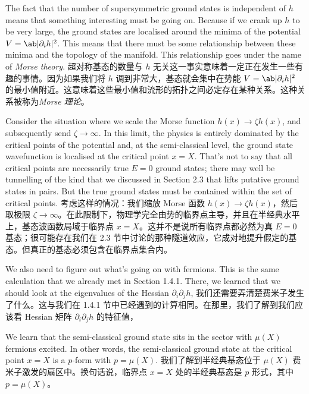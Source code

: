 \documentclass{article}
\begin{document}
\begin{paracol}{2}
The fact that the number of supersymmetric ground states is independent of $h$ means that something interesting must be going on. Because if we crank up $h$ to be very large, the ground states are localised around the minima of the potential $V = \ab|\partial_i h|^2$. This means that there must be some relationship between these minima and the topology of the manifold. This relationship goes under the name of \textit{Morse theory}.
\switchcolumn
超对称基态的数量与 $h$ 无关这一事实意味着一定正在发生一些有趣的事情。因为如果我们将 $h$ 调到非常大，基态就会集中在势能 $V = \ab|\partial_i h|^2$ 的最小值附近。这意味着这些最小值和流形的拓扑之间必定存在某种关系。这种关系被称为\textit{Morse 理论}。
\switchcolumn*

Consider the situation where we scale the Morse function $h(x) \to \zeta h(x)$, and subsequently send $\zeta \to \infty$. In this limit, the physics is entirely dominated by the critical points of the potential and, at the semi-classical level, the ground state wavefunction is localised at the critical point $x = X$. That’s not to say that all critical points are necessarily true $E = 0$ ground states; there may well be tunnelling of the kind that we discussed in Section 2.3 that lifts putative ground states in pairs. But the true ground states must be contained within the set of critical points.
\switchcolumn
考虑这样的情况：我们缩放 Morse 函数 $h(x) \to \zeta h(x)$，然后取极限 $\zeta \to \infty$。在此限制下，物理学完全由势的临界点主导，并且在半经典水平上，基态波函数局域于临界点 $x = X$。这并不是说所有临界点都必然为真 $E = 0$ 基态；很可能存在我们在 2.3 节中讨论的那种隧道效应，它成对地提升假定的基态。但真正的基态必须包含在临界点集合内。
\switchcolumn*

We also need to figure out what’s going on with fermions. This is the same calculation that we already met in Section 1.4.1. There, we learned that we should look at the eigenvalues of the Hessian $\partial_i \partial_j h$,
\switchcolumn
我们还需要弄清楚费米子发生了什么。这与我们在 1.4.1 节中已经遇到的计算相同。在那里，我们了解到我们应该看 Hessian 矩阵 $\partial_i \partial_j h$ 的特征值，
\switchcolumn*

We learn that the semi-classical ground state sits in the sector with $\mu(X)$ fermions excited. In other words, the semi-classical ground state at the critical point $x = X$ is a $p$-form with $p = \mu(X)$.
\switchcolumn
我们了解到半经典基态位于 $\mu(X)$ 费米子激发的扇区中。换句话说，临界点 $x = X$ 处的半经典基态是 $p$ 形式，其中 $p = \mu(X)$。
\switchcolumn*


\end{paracol}
\end{document}
